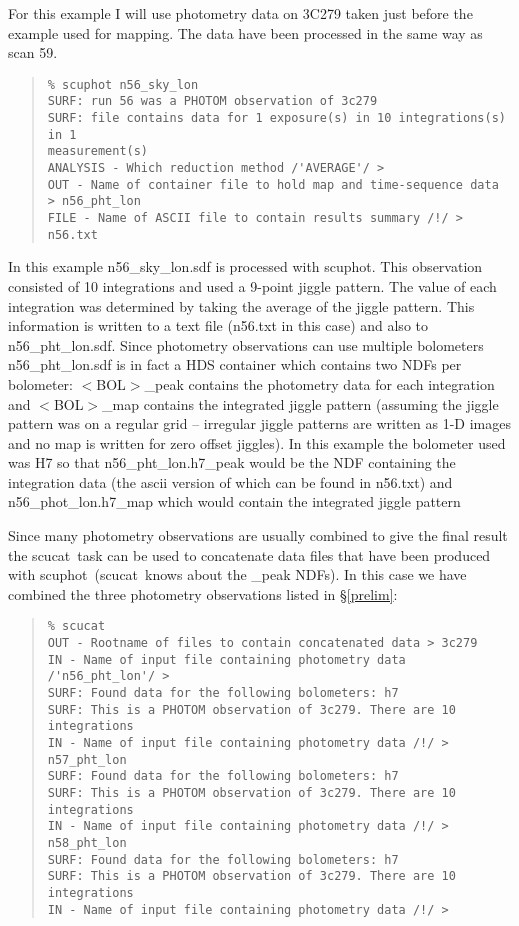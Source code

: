 \documentclass[twoside,11pt]{article}
\newcommand{\task}[1]{{\sf #1}}
\newcommand{\scuphot}{\htmlref{\task{scuphot}}{SCUPHOT}}
\newcommand{\scucat}{\htmlref{\task{scucat}}{SCUCAT}}
\newenvironment{myquote}{\begin{quote}\begin{small}}{\end{small}\end{quote}}
\newcommand{\htmlref}[2]{#1}
\begin{document}
For this example I will use photometry data on 3C279 taken just before
the example used for mapping. The data have been processed in the same 
way as scan 59.

\begin{myquote}
\begin{verbatim}
% scuphot n56_sky_lon
SURF: run 56 was a PHOTOM observation of 3c279
SURF: file contains data for 1 exposure(s) in 10 integrations(s) in 1
measurement(s)
ANALYSIS - Which reduction method /'AVERAGE'/ > 
OUT - Name of container file to hold map and time-sequence data > n56_pht_lon 
FILE - Name of ASCII file to contain results summary /!/ > n56.txt
\end{verbatim}
\end{myquote}

In this example n56\_sky\_lon.sdf is processed with \scuphot.  This
observation consisted of 10 integrations and used a 9-point jiggle pattern.
The value of each integration was determined by taking the average of the
jiggle pattern. This information is written to a text file (n56.txt in this
case) and also to n56\_pht\_lon.sdf. Since photometry observations can use
multiple bolometers n56\_pht\_lon.sdf is in fact a HDS container \cite{hds}
which contains two NDFs per bolometer: $<$BOL$>$\_peak contains the photometry
data for each integration and $<$BOL$>$\_map contains the integrated jiggle
pattern (assuming the jiggle pattern was on a regular grid -- irregular jiggle
patterns are written as 1-D images and no map is written for zero offset
jiggles).  In this example the bolometer used was H7 so that
n56\_pht\_lon.h7\_peak would be the NDF containing the integration data (the
ascii version of which can be found in n56.txt) and n56\_phot\_lon.h7\_map
which would contain the integrated jiggle pattern


Since many photometry observations are usually combined to give the final
result the \scucat\ task can be used to concatenate data files that have been
produced with \scuphot\ (\scucat\ knows about the \_peak NDFs). In this
case we have combined the three photometry observations listed in
\S\ref{prelim}:

\begin{myquote}
\begin{verbatim}
% scucat 
OUT - Rootname of files to contain concatenated data > 3c279
IN - Name of input file containing photometry data /'n56_pht_lon'/ > 
SURF: Found data for the following bolometers: h7
SURF: This is a PHOTOM observation of 3c279. There are 10 integrations
IN - Name of input file containing photometry data /!/ > n57_pht_lon
SURF: Found data for the following bolometers: h7
SURF: This is a PHOTOM observation of 3c279. There are 10 integrations
IN - Name of input file containing photometry data /!/ > n58_pht_lon
SURF: Found data for the following bolometers: h7
SURF: This is a PHOTOM observation of 3c279. There are 10 integrations
IN - Name of input file containing photometry data /!/ > 
\end{verbatim}
\end{myquote}
\end{document}
